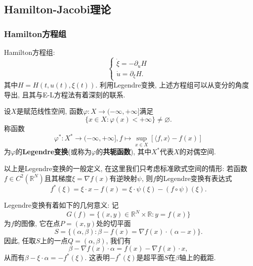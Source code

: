 \subsection{Hamilton-Jacobi理论}

\subsubsection{Hamilton方程组}

Hamilton方程组:
\begin{equation*}
    \begin{cases} 
        \dot\xi = -\partial_u H \\ 
        \dot u = \partial_{\xi}H. 
    \end{cases} 
\end{equation*}
其中$H = H(t, u(t), \xi(t))$. 利用Legendre变换, 上述方程组可以从变分的角度导出, 且其与E-L方程法有着深刻的联系.

\begin{definition}
    设$X$是赋范线性空间, 函数$\varphi\colon X \rightarrow (-\infty, +\infty]$满足
    \begin{equation*}
        \{x \in X\colon \varphi(x) < +\infty\} \neq \varnothing.
    \end{equation*}
    称函数 
    \begin{equation*}
        \boxed{\varphi^*\colon X^* \rightarrow (-\infty, +\infty], f \mapsto \sup_{x \in X}[\langle f, x\rangle - f(x)]}
    \end{equation*}
    为$\varphi$的\textbf{Legendre变换}(或称为$\varphi$的\textbf{共轭函数}), 其中$X^*$代表$X$的对偶空间.
\end{definition}

以上是Legendre变换的一般定义, 在这里我们只考虑标准欧式空间的情形: 若函数$f \in C^2(\mathbb{R}^N)$且其梯度$\xi = \nabla f(x)$有逆映射$\psi$, 则$f$的Legendre变换有表达式 
\begin{equation*}
    \boxed{f^*(\xi) = \xi \cdot x - f(x)= \xi \cdot \psi(\xi) - (f \circ \psi)(\xi).} 
\end{equation*}

\begin{remark}
    Legendre变换有着如下的几何意义: 记 
    \begin{equation*}
        G(f) = \{(x, y) \in \mathbb{R}^N \times \mathbb{R}\colon y = f(x)\}
    \end{equation*}
    为$f$的图像, 它在点$P = (x, y)$处的切平面
    \begin{equation*}
        S = \{(\alpha, \beta)\colon \beta - f(x) = \nabla f(x) \cdot (\alpha - x)\}. 
    \end{equation*}
    因此, 任取$S$上的一点$Q = (\alpha, \beta)$, 我们有 
    \begin{equation*}
        \beta - \nabla f(x) \cdot \alpha = f(x) - \nabla f(x) \cdot x,
    \end{equation*}
    从而有$\beta - \xi \cdot \alpha = -f^*(\xi)$. 这表明$-f^*(\xi)$是超平面$S$在$\beta$轴上的截距.
\end{remark}

